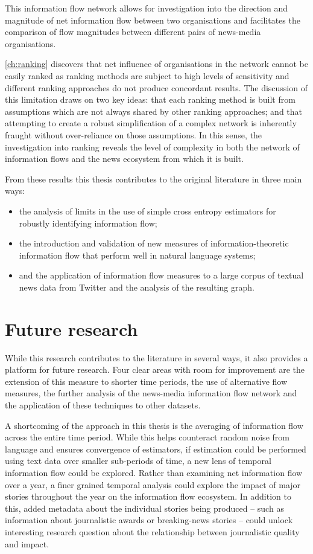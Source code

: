 This information flow network allows for investigation into the direction and magnitude of net information flow between two organisations and facilitates the comparison of flow magnitudes between different pairs of news-media organisations.

\autoref{ch:ranking} discovers that net influence of organisations in the network cannot be easily ranked as ranking methods are subject to high levels of sensitivity and different ranking approaches do not produce concordant results. The discussion of this limitation draws on two key ideas: that each ranking method is built from assumptions which are not always shared by other ranking approaches; and that attempting to create a robust simplification of a complex network is inherently fraught without over-reliance on those assumptions. In this sense, the investigation into ranking reveals the level of complexity in both the network of information flows and the news ecosystem from which it is built.


From these results this thesis contributes to the original literature in three main ways:
\begin{itemize}
	\item the analysis of limits in the use of simple cross entropy estimators for robustly identifying information flow;
	\item the introduction and validation of new measures of information-theoretic information flow that perform well in natural language systems;
	\item and the application of information flow measures to a large corpus of textual news data from Twitter and the analysis of the resulting graph.
\end{itemize}


\section{Future research}

While this research contributes to the literature in several ways, it also provides a platform for future research. Four clear areas with room for improvement are the extension of this measure to shorter time periods, the use of alternative flow measures, the further analysis of the news-media information flow network and the application of these techniques to other datasets.

A shortcoming of the approach in this thesis is the averaging of information flow across the entire time period. While this helps counteract random noise from language and ensures convergence of estimators, if estimation could be performed using text data over smaller sub-periods of time, a new lens of temporal information flow could be explored. Rather than examining net information flow over a year, a finer grained temporal analysis could explore the impact of major stories throughout the year on the information flow ecosystem. In addition to this, added metadata about the individual stories being produced -- such as information about journalistic awards or breaking-news stories -- could unlock interesting research question about the relationship between journalistic quality and impact.

